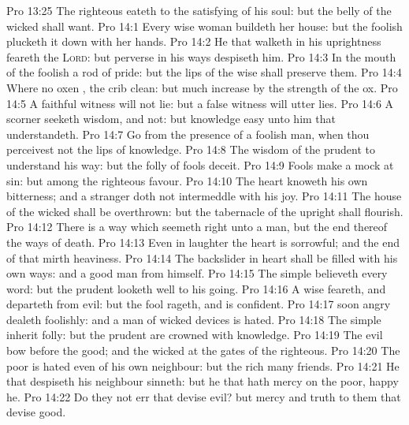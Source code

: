 \vs Pro 13:25 The righteous eateth to the satisfying of his soul: but the belly of the wicked shall want.
\vs Pro 14:1 Every wise woman buildeth her house: but the foolish plucketh it down with her hands.
\vs Pro 14:2 He that walketh in his uprightness feareth the \textsc{Lord}: but  perverse in his ways despiseth him.
\vs Pro 14:3 In the mouth of the foolish  a rod of pride: but the lips of the wise shall preserve them.
\vs Pro 14:4 Where no oxen , the crib  clean: but much increase  by the strength of the ox.
\vs Pro 14:5 A faithful witness will not lie: but a false witness will utter lies.
\vs Pro 14:6 A scorner seeketh wisdom, and  not: but knowledge  easy unto him that understandeth.
\vs Pro 14:7 Go from the presence of a foolish man, when thou perceivest not  the lips of knowledge.
\vs Pro 14:8 The wisdom of the prudent  to understand his way: but the folly of fools  deceit.
\vs Pro 14:9 Fools make a mock at sin: but among the righteous  favour.
\vs Pro 14:10 The heart knoweth his own bitterness; and a stranger doth not intermeddle with his joy.
\vs Pro 14:11 The house of the wicked shall be overthrown: but the tabernacle of the upright shall flourish.
\vs Pro 14:12 There is a way which seemeth right unto a man, but the end thereof  the ways of death.
\vs Pro 14:13 Even in laughter the heart is sorrowful; and the end of that mirth  heaviness.
\vs Pro 14:14 The backslider in heart shall be filled with his own ways: and a good man  from himself.
\vs Pro 14:15 The simple believeth every word: but the prudent  looketh well to his going.
\vs Pro 14:16 A wise  feareth, and departeth from evil: but the fool rageth, and is confident.
\vs Pro 14:17  soon angry dealeth foolishly: and a man of wicked devices is hated.
\vs Pro 14:18 The simple inherit folly: but the prudent are crowned with knowledge.
\vs Pro 14:19 The evil bow before the good; and the wicked at the gates of the righteous.
\vs Pro 14:20 The poor is hated even of his own neighbour: but the rich  many friends.
\vs Pro 14:21 He that despiseth his neighbour sinneth: but he that hath mercy on the poor, happy  he.
\vs Pro 14:22 Do they not err that devise evil? but mercy and truth  to them that devise good.
